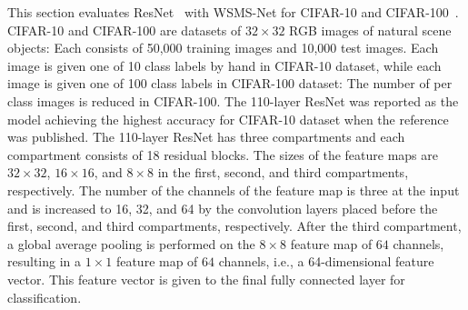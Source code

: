 \documentclass[journal]{IEEEtran}
\begin{document}
This section evaluates ResNet~\cite{He2017} with WSMS-Net for CIFAR-10 and CIFAR-100~\cite{Krizhevsky2009}.
CIFAR-10 and CIFAR-100 are datasets of $32\times32$ RGB images of natural scene objects: Each consists of 50,000 training images and 10,000 test images.
Each image is given one of 10 class labels by hand in CIFAR-10 dataset, while each image is given one of 100 class labels in CIFAR-100 dataset: The number of per class images is reduced in CIFAR-100.
The 110-layer ResNet was reported as the model achieving the highest accuracy for CIFAR-10 dataset when the reference~\cite{He2017} was published.
The 110-layer ResNet has three compartments and each compartment consists of 18 residual blocks.
The sizes of the feature maps are $32\times32$, $16\times16$, and $8\times8$ in the first, second, and third compartments, respectively.
The number of the channels of the feature map is three at the input and is increased to 16, 32, and 64 by the convolution layers placed before the first, second, and third compartments, respectively.
After the third compartment, a global average pooling is performed on the $8\times8$ feature map of $64$ channels, resulting in a $1\times1$ feature map of $64$ channels, i.e., a 64-dimensional feature vector.
This feature vector is given to the final fully connected layer for classification.
\end{document}
